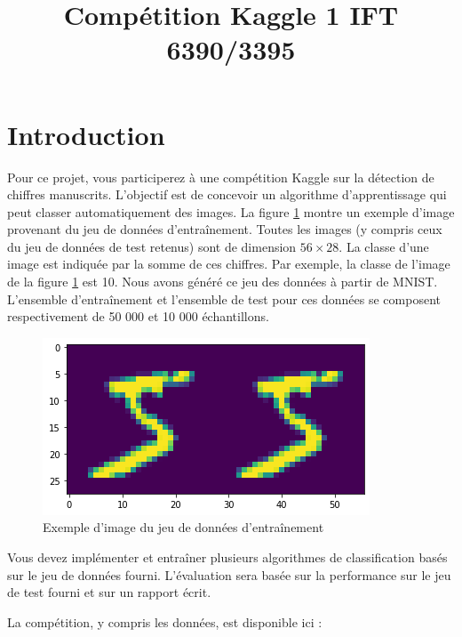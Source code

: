 \documentclass[12pt]{article}
\begin{document}
 
 
 
\title{Compétition Kaggle 1 IFT 6390/3395}
 
\maketitle

\section{Introduction}
\label{sec:intro}

Pour ce projet, vous participerez à une compétition Kaggle sur la détection de chiffres manuscrits. L'objectif est de concevoir un algorithme d'apprentissage qui peut classer automatiquement des images. La figure \ref{fig:my_label} montre un exemple d'image provenant du jeu de données d'entraînement. Toutes les images (y compris ceux du jeu de données de test retenus) sont de dimension $56\times28$. La classe d'une image est indiquée par la somme de ces chiffres. Par exemple, la classe de l'image de la figure \ref{fig:my_label} est 10. Nous avons généré ce jeu des données à partir de MNIST. L'ensemble d'entraînement et l'ensemble de test pour ces données se composent respectivement de 50 000 et 10 000 échantillons. 
\begin{figure}[h]
    \centering
    \includegraphics[width=0.5\linewidth]{figures/img1.png} 
    
    \caption{Exemple d'image du jeu de données d'entraînement}
    \label{fig:my_label}
\end{figure}
Vous devez implémenter et entraîner plusieurs algorithmes de classification basés sur le jeu de données fourni. L'évaluation sera basée sur la performance sur le jeu de test fourni et sur un rapport écrit.

La compétition, y compris les données, est disponible ici : 
\end{document}
